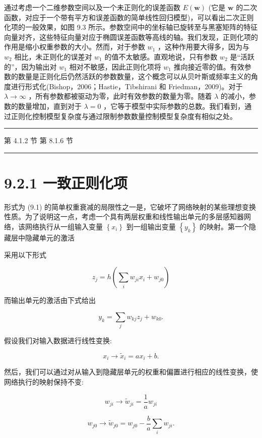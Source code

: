 \documentclass[10pt]{report}
\newcommand{\HRule}{\begin{center}\rule{0.9\linewidth}{0.2mm}\end{center}}
\begin{document}
通过考虑一个二维参数空间以及一个未正则化的误差函数 \(E\left( \mathbf{w}\right)\) (它是 \(\mathbf{w}\) 的二次函数，对应于一个带有平方和误差函数的简单线性回归模型)，可以看出二次正则化项的一般效果，如图 9.3 所示。参数空间中的坐标轴已旋转至与黑塞矩阵的特征向量对齐，这些特征向量对应于椭圆误差函数等高线的轴。我们发现，正则化项的作用是缩小权重参数的大小。然而，对于参数 \({w}_{1}\) ，这种作用要大得多，因为与 \({w}_{2}\) 相比，未正则化的误差对 \({w}_{1}\) 的值不太敏感。直观地说，只有参数 \({w}_{2}\) 是“活跃的”，因为输出对 \({w}_{1}\) 相对不敏感，因此正则化项将 \({w}_{1}\) 推向接近零的值。有效参数的数量是正则化后仍然活跃的参数数量，这个概念可以从贝叶斯或频率主义的角度进行形式化(Bishop，2006；Hastie，Tibshirani 和 Friedman，2009)。对于 \(\lambda  \rightarrow  \infty\) ，所有参数都被驱动为零，此时有效参数的数量为零。随着 \(\lambda\) 的减小，参数的数量增加，直到对于 \(\lambda  = 0\) ，它等于模型中实际参数的总数。我们看到，通过正则化控制模型复杂度与通过限制参数数量控制模型复杂度有相似之处。

\HRule

第 4.1.2 节 第 8.1.6 节

\HRule

\section*{9.2.1 一致正则化项}

形式为 (9.1) 的简单权重衰减的局限性之一是，它破坏了网络映射的某些理想变换性质。为了说明这一点，考虑一个具有两层权重和线性输出单元的多层感知器网络，该网络执行从一组输入变量 \(\left\{  {x}_{i}\right\}\) 到一组输出变量 \(\left\{  {y}_{k}\right\}\) 的映射。第一个隐藏层中隐藏单元的激活

采用以下形式

\[
{z}_{j} = h\left( {\mathop{\sum }\limits_{i}{w}_{ji}{x}_{i} + {w}_{j0}}\right)  \tag{9.6}
\]

而输出单元的激活由下式给出

\[
{y}_{k} = \mathop{\sum }\limits_{j}{w}_{kj}{z}_{j} + {w}_{k0}. \tag{9.7}
\]

假设我们对输入数据进行线性变换:

\[
{x}_{i} \rightarrow  {\widetilde{x}}_{i} = a{x}_{i} + b. \tag{9.8}
\]

然后，我们可以通过对从输入到隐藏层单元的权重和偏置进行相应的线性变换，使网络执行的映射保持不变:

\[
{w}_{ji} \rightarrow  {\widetilde{w}}_{ji} = \frac{1}{a}{w}_{ji} \tag{9.9}
\]

\[
{w}_{j0} \rightarrow  {\widetilde{w}}_{j0} = {w}_{j0} - \frac{b}{a}\mathop{\sum }\limits_{i}{w}_{ji}. \tag{9.10}
\]
\end{document}
